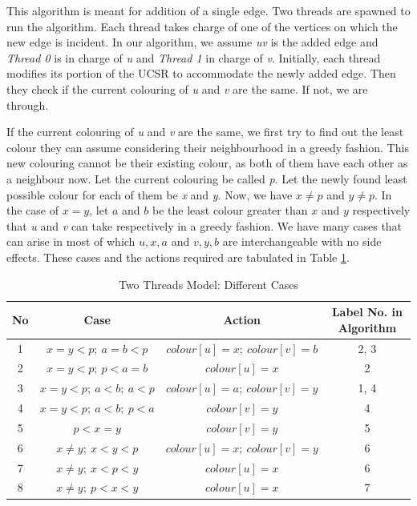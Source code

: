 \documentclass[MTech]{iitmdiss}
\begin{document}
This algorithm is meant for addition of a single edge. Two threads are spawned to run the algorithm. Each thread takes charge of one of the vertices on which the new edge is incident. In our algorithm, we assume \textit{uv} is the added edge and \textit{Thread 0} is in charge of \textit{u} and \textit{Thread 1} in charge of \textit{v}. Initially, each thread modifies its portion of the UCSR to accommodate the newly added edge. Then they check if the current colouring of \textit{u} and \textit{v} are the same. If not, we are through.

If the current colouring of \textit{u} and \textit{v} are the same, we first try to find out the least colour they can assume considering their neighbourhood in a greedy fashion. This new colouring cannot be their existing colour, as both of them have each other as a neighbour now. Let the current colouring be called \textit{p}. Let the newly found least possible colour for each of them be \textit{x} and \textit{y}. Now, we have $x \neq p$ and $y \neq p$. In the case of $x=y$, let $a$ and $b$  be the least colour greater than $x$ and $y$ respectively that \textit{u} and \textit{v} can take respectively in a greedy fashion. We have many cases that can arise in most of which $u, x, a$ and $v, y, b$ are interchangeable with no side effects. These cases and the actions required are tabulated in Table \ref{table:3}. 

\begin{table}[h]
\centering
\begin{tabular}{||c|c|c|c||} 
 \hline
 No & Case & Action & Label No. in Algorithm \\ [0.5ex] 
 \hline\hline
1 & $x=y < p; \: a=b<p$ & $colour[u]=x; \: colour[v]=b$ & 2, 3 \\
\hline
2 & $x=y < p; \: p<a=b$ & $colour[u]=x$ & 2 \\
\hline
3 & $x=y < p; \: a<b; \: a<p$ & $colour[u]=a; \: colour[v]=y$ & 1, 4 \\
\hline
4 & $x=y < p; \: a<b; \: p<a$ & $colour[v]=y$ & 4 \\
\hline
5 & $p < x=y$ & $colour[v]=y$ & 5\\
\hline
6 & $x \neq y; \: x < y < p$ & $colour[u]=x; \: colour[v]=y$ & 6\\
\hline
7 & $x \neq y; \: x < p < y$ & $colour[u]=x$ & 6\\
\hline
8 & $x \neq y; \: p < x < y$ & $colour[u]=x$& 7\\
\hline
\end{tabular}
\caption{Two Threads Model: Different Cases}
\label{table:3}
\end{table}
\end{document}
